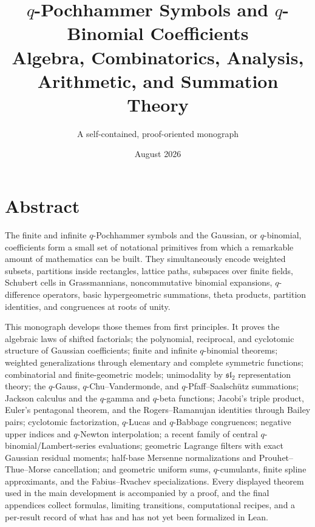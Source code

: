 \documentclass[11pt,oneside,openany]{book}
\title{\Huge\bfseries $q$-Pochhammer Symbols and $q$-Binomial Coefficients\\[8pt]
\Large Algebra, Combinatorics, Analysis, Arithmetic, and Summation Theory}
\author{A self-contained, proof-oriented monograph}
\date{August 2026}
\theoremstyle{definition}
\theoremstyle{remark}
\begin{document}
\frontmatter
\hypersetup{pageanchor=false}
\maketitle
\hypersetup{pageanchor=true}

\chapter*{Abstract}
The finite and infinite $q$-Pochhammer symbols and the Gaussian, or $q$-binomial, coefficients form a small set of notational primitives from which a remarkable amount of mathematics can be built.  They simultaneously encode weighted subsets, partitions inside rectangles, lattice paths, subspaces over finite fields, Schubert cells in Grassmannians, noncommutative binomial expansions, $q$-difference operators, basic hypergeometric summations, theta products, partition identities, and congruences at roots of unity.

This monograph develops those themes from first principles.  It proves the algebraic laws of shifted factorials; the polynomial, reciprocal, and cyclotomic structure of Gaussian coefficients; finite and infinite $q$-binomial theorems; weighted generalizations through elementary and complete symmetric functions; combinatorial and finite-geometric models; unimodality by $\mathfrak{sl}_2$ representation theory; the $q$-Gauss, $q$-Chu--Vandermonde, and $q$-Pfaff--Saalsch\"utz summations; Jackson calculus and the $q$-gamma and $q$-beta functions; Jacobi's triple product, Euler's pentagonal theorem, and the Rogers--Ramanujan identities through Bailey pairs; cyclotomic factorization, $q$-Lucas and $q$-Babbage congruences; negative upper indices and $q$-Newton interpolation; a recent family of central $q$-binomial/Lambert-series evaluations; geometric Lagrange filters with exact Gaussian residual moments; half-base Mersenne normalizations and Prouhet--Thue--Morse cancellation; and geometric uniform sums, $q$-cumulants, finite spline approximants, and the Fabius--Rvachev specializations.  Every displayed theorem used in the main development is accompanied by a proof, and the final appendices collect formulas, limiting transitions, computational recipes, and a per-result record of what has and has not yet been formalized in Lean.
\end{document}
